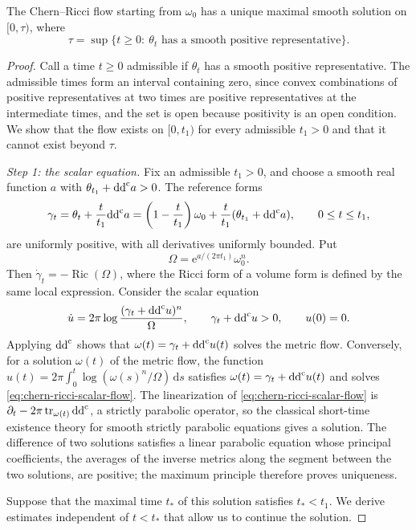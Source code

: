 \begin{theorem}\label{thm:chern-ricci-maximal-time}
The Chern--Ricci flow starting from $\omega_0$ has a unique maximal smooth solution on $[0,\tau)$, where
\[
 \tau=\sup\{t\geq0:\ \theta_t\text{ has a smooth positive representative}\}.
\]
\end{theorem}
\begin{proof}
Call a time $t\geq0$ admissible if $\theta_t$ has a smooth positive representative. The admissible times form an interval containing zero, since convex combinations of positive representatives at two times are positive representatives at the intermediate times, and the set is open because positivity is an open condition. We show that the flow exists on $[0,t_1)$ for every admissible $t_1>0$ and that it cannot exist beyond $\tau$.

\emph{Step 1: the scalar equation.} Fix an admissible $t_1>0$, and choose a smooth real function $a$ with $\theta_{t_1}+\mathrm{dd}^{\mathrm{c}} a>0$. The reference forms
\[
 \gamma_t=\theta_t+\frac t{t_1}\mathrm{dd}^{\mathrm{c}} a
          =\left(1-\frac t{t_1}\right)\omega_0
             +\frac t{t_1}(\theta_{t_1}+\mathrm{dd}^{\mathrm{c}} a),\qquad 0\leq t\leq t_1,
\]
are uniformly positive, with all derivatives uniformly bounded. Put
\[
 \Omega=\mathrm{e}^{a/(2\pi t_1)}\omega_0^n.
\]
Then $\dot\gamma_t=-\operatorname{Ric}(\Omega)$, where the Ricci form of a volume form is defined by the same local expression. Consider the scalar equation
\begin{equation}\label{eq:chern-ricci-scalar-flow}
 \dot u=2\pi\log\frac{(\gamma_t+\mathrm{dd}^{\mathrm{c}} u)^n}{\Omega},
 \qquad \gamma_t+\mathrm{dd}^{\mathrm{c}} u>0,\qquad u(0)=0.
\end{equation}
Applying $\mathrm{dd}^{\mathrm{c}}$ shows that $\omega(t)=\gamma_t+\mathrm{dd}^{\mathrm{c}} u(t)$ solves the metric flow. Conversely, for a solution $\omega(t)$ of the metric flow, the function $u(t)=2\pi\int_0^t\log(\omega(s)^n/\Omega)\,\mathrm ds$ satisfies $\omega(t)=\gamma_t+\mathrm{dd}^{\mathrm{c}} u(t)$ and solves \eqref{eq:chern-ricci-scalar-flow}. The linearization of \eqref{eq:chern-ricci-scalar-flow} is $\partial_t-2\pi\operatorname{tr}_{\omega(t)}\mathrm{dd}^{\mathrm{c}}$, a strictly parabolic operator, so the classical short-time existence theory for smooth strictly parabolic equations gives a solution. The difference of two solutions satisfies a linear parabolic equation whose principal coefficients, the averages of the inverse metrics along the segment between the two solutions, are positive; the maximum principle therefore proves uniqueness.

Suppose that the maximal time $t_*$ of this solution satisfies $t_*<t_1$. We derive estimates independent of $t<t_*$ that allow us to continue the solution.


\end{proof}
